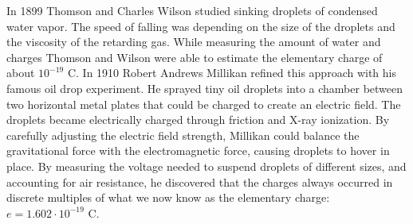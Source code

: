\documentclass[
  a4paper,
]{book}
\begin{document}
In 1899 Thomson and Charles Wilson studied sinking droplets of condensed
water vapor. The speed of falling was depending on the size of the
droplets and the viscosity of the retarding gas. While measuring the
amount of water and charges Thomson and Wilson were able to estimate the
elementary charge of about \(10^{-19} \mbox{ C}\). In 1910 Robert
Andrews Millikan refined this approach with his famous oil drop
experiment. He sprayed tiny oil droplets into a chamber between two
horizontal metal plates that could be charged to create an electric
field. The droplets became electrically charged through friction and
X-ray ionization. By carefully adjusting the electric field strength,
Millikan could balance the gravitational force with the electromagnetic
force, causing droplets to hover in place. By measuring the voltage
needed to suspend droplets of different sizes, and accounting for air
resistance, he discovered that the charges always occurred in discrete
multiples of what we now know as the elementary charge:
\(e = 1.602\cdot 10^{-19} \mbox{ C}\).
\end{document}

